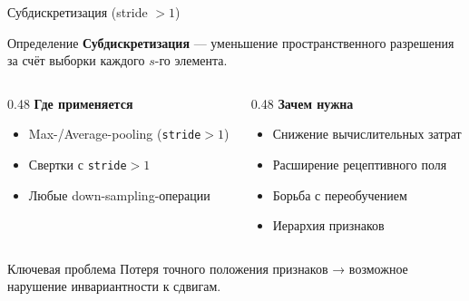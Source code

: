 \documentclass[aspectratio=169]{beamer}
\begin{document}
\begin{frame}{Субдискретизация (stride $>1$)}
    \begin{block}{Определение}
        \textbf{Субдискретизация} — уменьшение пространственного разрешения за счёт выборки каждого $s$-го элемента.
    \end{block}

    \begin{columns}[T]
        \begin{column}{0.48\textwidth}
            \textbf{Где применяется}
            \begin{itemize}
                \item Max-/Average-pooling (\texttt{stride}$>1$)
                \item Свертки с \texttt{stride}$>1$
                \item Любые down-sampling-операции
            \end{itemize}
        \end{column}
        \begin{column}{0.48\textwidth}
            \textbf{Зачем нужна}
            \begin{itemize}
                \item Снижение вычислительных затрат
                \item Расширение рецептивного поля
                \item Борьба с переобучением
                \item Иерархия признаков
            \end{itemize}
        \end{column}
    \end{columns}

    \begin{alertblock}{Ключевая проблема}
        Потеря точного положения признаков → возможное нарушение инвариантности к сдвигам.
    \end{alertblock}
\end{frame}
\end{document}
